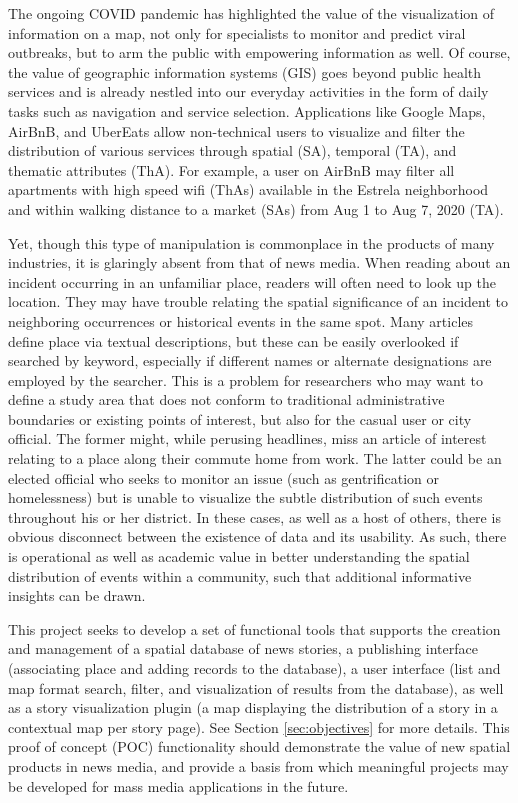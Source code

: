 The ongoing COVID pandemic has highlighted the value of the visualization of information on a map, not only for specialists to monitor and predict viral outbreaks, but to arm the public with empowering information as well. Of course, the value of geographic information systems (GIS) goes beyond public health services and is already nestled into our everyday activities in the form of daily tasks such as navigation and service selection. Applications like Google Maps, AirBnB, and UberEats allow non-technical users to visualize and filter the distribution of various services through spatial (SA), temporal (TA), and thematic attributes (ThA). For example, a user on AirBnB may filter all apartments with high speed wifi (ThAs) available in the Estrela neighborhood and within walking distance to a market (SAs) from Aug 1 to Aug 7, 2020 (TA).

Yet, though this type of manipulation is commonplace in the products of many industries, it is glaringly absent from that of news media.  When reading about an incident occurring in an unfamiliar place, readers will often need to look up the location. They may have trouble relating the spatial significance of an incident to neighboring occurrences or historical events in the same spot. Many articles define place via textual descriptions, but these can be easily overlooked if searched by keyword, especially if different names or alternate designations are employed by the searcher.  This is a problem for researchers who may want to define a study area that does not conform to traditional administrative boundaries or existing points of interest, but also for the casual user or city official.  The former might, while perusing headlines, miss an article of interest relating to a place along their commute home from work. The latter could be an elected official who seeks to monitor an issue (such as gentrification or homelessness) but is unable to visualize the subtle distribution of such events throughout his or her district. In these cases, as well as a host of others, there is obvious disconnect between the existence of data and its usability.  As such, there is operational as well as academic value in better understanding the spatial distribution of events within a community, such that additional informative insights can be drawn.  

This project seeks to develop a set of functional tools that supports the creation and management of a spatial database of news stories, a publishing interface (associating place and adding records to the database), a user interface (list and map format search, filter, and visualization of results from the database), as well as a story visualization plugin (a map displaying the distribution of a story in a contextual map per story page).  See Section \ref{sec:objectives} for more details. This proof of concept (POC) functionality should demonstrate the value of new spatial products in news media, and provide a basis from which meaningful projects may be developed for mass media applications in the future.

